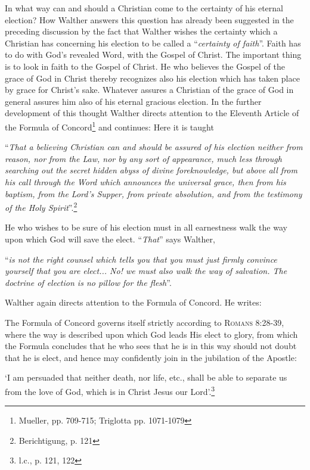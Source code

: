                 In what way can and should a Christian come to the certainty of his eternal election?  How Walther answers this question has already been suggested in the preceding discussion by the fact that Walther wishes the certainty which a Christian has concerning his election to be called a “\textit{certainty of faith}”.  Faith has to do with God’s revealed Word, with the Gospel of Christ.  The important thing is to look in faith to the Gospel of Christ.  He who believes the Gospel of the grace of God in Christ thereby recognizes also his election which has taken place by grace for Christ’s sake.  Whatever assures a Christian of the grace of God in general assures him also of his eternal gracious election.  In the further development of this thought Walther directs attention to the Eleventh Article of the Formula of Concord\footnote{Mueller, pp. 709-715; Triglotta pp. 1071-1079} and continues: Here it is taught \begin{displayquote} “\textit{That a believing Christian can and should be assured of his election neither from reason, nor from the Law, nor by any sort of appearance, much less through searching out the secret hidden abyss of divine foreknowledge, but above all from his call through the Word which announces the universal grace, then from his baptism, from the Lord’s Supper, from private absolution, and from the testimony of the Holy Spirit}”.\footnote{Berichtigung, p. 121}\end{displayquote} He who wishes to be sure of his election must in all earnestness walk the way upon which God will save the elect.  “\textit{That}” says Walther, \begin{displayquote} “\textit{is not the right counsel which tells you that you must just firmly convince yourself that you are elect... No! we must also walk the way of salvation.  The doctrine of election is no pillow for the flesh}”.\end{displayquote}  Walther again directs attention to the Formula of Concord.  He writes: \begin{fancyquotes}The Formula of Concord governs itself strictly according to {\scriptsize\textsc{Romans 8:28-39}}, where the way is described upon which God leads His elect to glory, from which the Formula concludes that he who sees that he is in this way should not doubt that he is elect, and hence may confidently join in the jubilation of the Apostle: \begin{displayquote}{\footnotesize ‘I am persuaded that neither death, nor life, etc., shall be able to separate us from the love of God, which is in Christ Jesus our Lord’.}\footnote{l.c., p. 121, 122}\end{displayquote}\end{fancyquotes}

